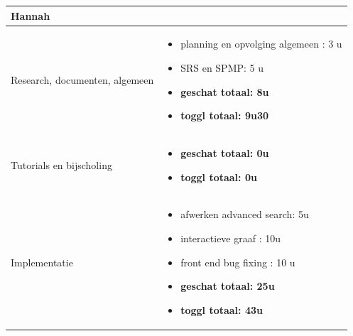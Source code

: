 \documentclass{article}
\begin{document}
\begin{center}
\begin{tabularx}{\textwidth}[t]{XX}
\arrayrulecolor{green}\hline

\arrayrulecolor{green}\hline
\vspace{.1 mm}
\textbf{\textcolor{myGreen}{\large{Hannah}}} \vspace{.1 mm} & \\
\hline
\vspace{1 mm}
Research, documenten, algemeen & 
\begin{minipage}[t]{\linewidth}%
\vspace{1 mm}
\begin{itemize}
\item planning en opvolging algemeen : 3 u
\item SRS en SPMP: 5 u
\item \textbf{geschat totaal: 8u}
\item \textbf{toggl totaal: 9u30}
\end{itemize} 
\vspace{1 mm}
\end{minipage}\\

\arrayrulecolor{black}\hline

\vspace{1 mm}
Tutorials en bijscholing & 
\begin{minipage}[t]{\linewidth}%
\vspace{1 mm}
\begin{itemize}
\item \textbf{geschat totaal: 0u}
\item \textbf{toggl totaal: 0u}
\end{itemize} 
\vspace{1 mm}
\end{minipage}\\

\arrayrulecolor{black}\hline


\vspace{1 mm}
Implementatie & 
\begin{minipage}[t]{\linewidth}%
\vspace{1 mm}
\begin{itemize}
\item afwerken advanced search: 5u
\item interactieve graaf : 10u 
\item front end bug fixing : 10 u
\item \textbf{geschat totaal: 25u}
\item \textbf{toggl totaal: 43u}
\end{itemize} 
\vspace{1 mm}
\end{minipage}\\



\end{tabularx}
\end{center}
\end{document}
